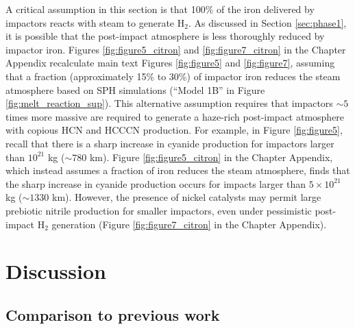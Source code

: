 A critical assumption in this section is that 100\% of the iron delivered by impactors reacts with steam to generate H$_2$. As discussed in Section \ref{sec:phase1}, it is possible that the post-impact atmosphere is less thoroughly reduced by impactor iron. Figures \ref{fig:figure5_citron} and \ref{fig:figure7_citron} in the Chapter Appendix recalculate main text Figures \ref{fig:figure5} and \ref{fig:figure7}, assuming that a fraction (approximately 15\% to 30\%) of impactor iron reduces the steam atmosphere based on SPH simulations (``Model 1B'' in Figure \ref{fig:melt_reaction_sup}). This alternative assumption requires that impactors $\sim 5$ times more massive are required to generate a haze-rich post-impact atmosphere with copious HCN and HCCCN production. For example, in Figure \ref{fig:figure5}, recall that there is a sharp increase in cyanide production for impactors larger than $10^{21}$ kg ($\sim 780$ km). Figure \ref{fig:figure5_citron} in the Chapter Appendix, which instead assumes a fraction of iron reduces the steam atmosphere, finds that the sharp increase in cyanide production occurs for impacts larger than $5 \times 10^{21}$ kg ($\sim 1330$ km). However, the presence of nickel catalysts may permit large prebiotic nitrile production for smaller impactors, even under pessimistic post-impact H$_2$ generation (Figure \ref{fig:figure7_citron} in the Chapter Appendix).

\section{Discussion}

\subsection{Comparison to previous work}

